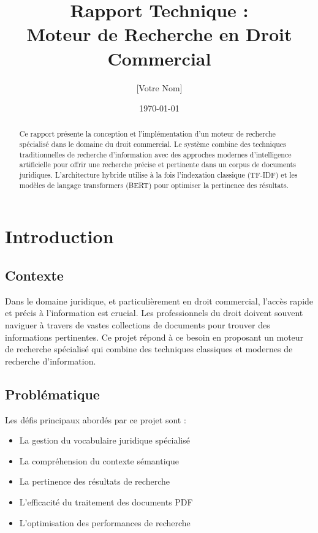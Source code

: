 \documentclass[12pt,a4paper]{article}
\title{\textbf{Rapport Technique : \\ Moteur de Recherche en Droit Commercial}}
\author{[Votre Nom]}
\date{\today}
\begin{document}
\maketitle

\begin{abstract}
Ce rapport présente la conception et l'implémentation d'un moteur de recherche spécialisé dans le domaine du droit commercial. Le système combine des techniques traditionnelles de recherche d'information avec des approches modernes d'intelligence artificielle pour offrir une recherche précise et pertinente dans un corpus de documents juridiques. L'architecture hybride utilise à la fois l'indexation classique (TF-IDF) et les modèles de langage transformers (BERT) pour optimiser la pertinence des résultats.
\end{abstract}

\tableofcontents
\newpage

\section{Introduction}
\subsection{Contexte}
Dans le domaine juridique, et particulièrement en droit commercial, l'accès rapide et précis à l'information est crucial. Les professionnels du droit doivent souvent naviguer à travers de vastes collections de documents pour trouver des informations pertinentes. Ce projet répond à ce besoin en proposant un moteur de recherche spécialisé qui combine des techniques classiques et modernes de recherche d'information.

\subsection{Problématique}
Les défis principaux abordés par ce projet sont :
\begin{itemize}
    \item La gestion du vocabulaire juridique spécialisé
    \item La compréhension du contexte sémantique
    \item La pertinence des résultats de recherche
    \item L'efficacité du traitement des documents PDF
    \item L'optimisation des performances de recherche
\end{itemize}
\end{document}
